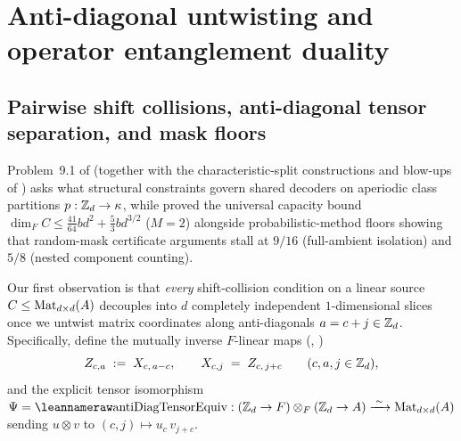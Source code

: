 \section{Anti-diagonal untwisting and operator entanglement duality}\label{sec:duality}

\subsection{Pairwise shift collisions, anti-diagonal tensor separation, and mask floors}\label{sec:antidiag}

Problem~9.1 of \cite{SeventeenthPaper2026} (together with the characteristic-split constructions
and blow-ups of \cite{ClassUniformMemo2026}) asks what structural constraints govern shared decoders
on aperiodic class partitions $p : \mathbb{Z}_d \to \kappa$, while \cite[Theorem~3.4 and
Appendix~C]{SharedDecoders2026} proved the universal capacity bound
$\dim_F C \le \frac{41}{64} b d^2 + \frac{5}{3} b d^{3/2}$ ($M = 2$) alongside probabilistic-method
floors showing that random-mask certificate arguments stall at $9/16$ (full-ambient isolation) and
$5/8$ (nested component counting).

Our first observation is that \emph{every} shift-collision condition on a linear source
$C \le \operatorname{Mat}_{d\times d}(A)$ decouples into $d$ completely independent $1$-dimensional slices once
we untwist matrix coordinates along anti-diagonals $a = c + j \in \mathbb{Z}_d$. Specifically, define the
mutually inverse $F$-linear maps (, )
\[
  Z_{c,a} \;:=\; X_{c,\,a - c},
  \qquad
  X_{c,j} \;=\; Z_{c,\,j + c}
  \qquad (c, a, j \in \mathbb{Z}_d),
\]
and the explicit tensor isomorphism
$\Psi = \lean{antiDiagTensorEquiv} : (\Z_d \to F) \otimes_F (\Z_d \to A) \xrightarrow{\;\sim\;}
\Mat_{d\times d}(A)$ sending $u \otimes v$ to $(c, j) \mapsto u_c\,v_{j+c}$.

